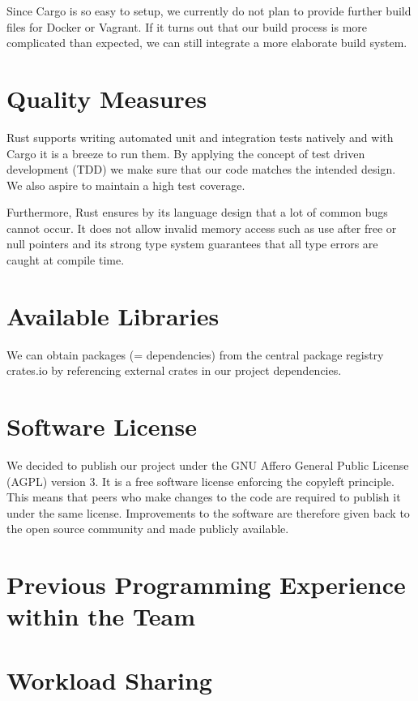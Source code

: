 \documentclass[a4paper, 11pt]{article}
\begin{document}
Since Cargo is so easy to setup, we currently do not plan to provide further build files for Docker or Vagrant. If it turns out that our build process is more complicated than expected, we can still integrate a more elaborate build system.

\section*{Quality Measures}
Rust supports writing automated unit and integration tests natively and with Cargo it is a breeze to run them. By applying the concept of test driven development (TDD) we make sure that our code matches the intended design. We also aspire to maintain a high test coverage.

Furthermore, Rust ensures by its language design that a lot of common bugs cannot occur. It does not allow invalid memory access such as use after free or null pointers and its strong type system guarantees that all type errors are caught at compile time.

\section*{Available Libraries}
We can obtain packages (= dependencies) from the central package registry crates.io \cite{Crates} by referencing external crates in our project dependencies.

\section*{Software License}
We decided to publish our project under the GNU Affero General Public License (AGPL) version 3. \cite{AGPL} It is a free software license enforcing the copyleft principle. This means that peers who make changes to the code are required to publish it under the same license. Improvements to the software are therefore given back to the open source community and made publicly available. 


\section*{Previous Programming Experience within the Team}
\lipsum[7]

\section*{Workload Sharing}
\lipsum[8]
\end{document}
